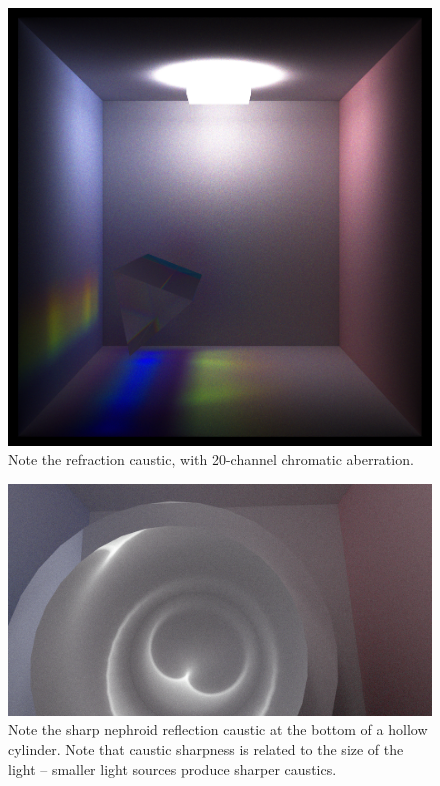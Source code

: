 \documentclass[12pt]{article}
\begin{document}
\begin{figure} 
\centering
  \includegraphics[width = 6 in]{v_rt_reflect_prism2.png}
  \caption{ Note the refraction caustic, with 20-channel chromatic aberration.
}
\end{figure}


\begin{figure} 
\centering
  \includegraphics[width = 6 in]{sharp_caustic.png}
  \caption{ Note the sharp nephroid reflection caustic at the bottom of a hollow cylinder.
Note that caustic sharpness is related to the size of the light -- smaller light sources produce sharper caustics.
}
\end{figure}
\end{document}
